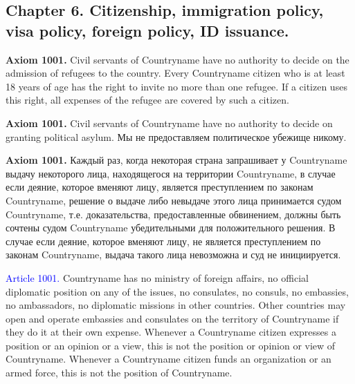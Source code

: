 \documentclass[11pt]{article}
\theoremstyle{remark}
\theoremstyle{definition}
\begin{document}
\color{black}


























\subsection*{Chapter 6. Citizenship, immigration policy, visa policy, foreign policy, ID issuance.}



\textbf{Axiom 1001.} Civil servants of Countryname have no authority to decide on the admission of refugees to the country. Every Countryname citizen who is at least 18 years of age has the right to invite no more than one refugee. If a citizen uses this right, all expenses of the refugee are covered by such a citizen.


\textbf{Axiom 1001.} Civil servants of Countryname have no authority to decide on granting political asylum. Мы не предоставляем политическое убежище никому. 

\textbf{Axiom 1001.} Каждый раз, когда некоторая страна запрашивает у Countryname выдачу некоторого лица, находящегося на территории Countryname, в случае если деяние, которое вменяют лицу, является преступлением по законам Countryname, решение о выдаче либо невыдаче этого лица принимается судом Countryname, т.е. доказательства, предоставленные обвинением, должны быть сочтены судом Countryname убедительными для положительного решения. В случае если деяние, которое вменяют лицу, не является преступлением по законам Countryname, выдача такого лица невозможна и суд не инициируется.




\textcolor{blue}{Article 1001.} Countryname has no ministry of foreign affairs, no official diplomatic position on any of the issues, no consulates, no consuls, no embassies, no ambassadors, no diplomatic missions in other countries. Other countries may open and operate embassies and consulates on the territory of Countryname if they do it at their own expense. Whenever a Countryname citizen expresses a position or an opinion or a view, this is not the position or opinion or view of Countryname. Whenever a Countryname citizen funds an organization or an armed force, this is not the position of Countryname. 
\end{document}

